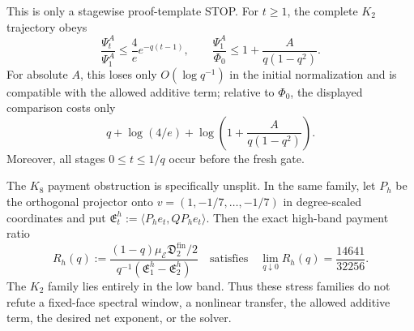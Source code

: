 \begin{proposition}
This is only a stagewise proof-template STOP.  For $t\geq1$, the complete
$K_2$ trajectory obeys
\begin{equation}
 \frac{\Psi_t^A}{\Psi_1^A}
 \leq\frac4e e^{-q(t-1)},
 \qquad
 \frac{\Psi_1^A}{\Phi_0}
 \leq1+\frac{A}{q(1-q^2)}.
 \label{eq:aesp-cd-k2-low-mode-global-bound}
\end{equation}
For absolute $A$, this loses only $O(\log q^{-1})$ in the initial
normalization and is compatible with the allowed additive term; relative to
$\Phi_0$, the displayed comparison costs only
\begin{equation*}
 q+\log(4/e)+\log\left(1+\frac{A}{q(1-q^2)}\right).
\end{equation*}
Moreover, all stages $0\leq t\leq1/q$ occur before the fresh gate.

The $K_8$ payment obstruction is specifically unsplit.  In the same family,
let $P_h$ be the orthogonal projector onto
$v=(1,-1/7,\ldots,-1/7)$ in degree-scaled coordinates and put
$\mathfrak E_t^h:=\langle P_he_t,QP_he_t\rangle$.  Then the exact high-band
payment ratio
\begin{equation}
 R_h(q):=
 \frac{(1-q)\mu_{\mathcal E}\mathfrak D_2^{\mathrm{fin}}/2}
      {q^{-1}(\mathfrak E_1^h-\mathfrak E_2^h)}
 \quad\text{satisfies}\quad
 \lim_{q\downarrow0}R_h(q)=\frac{14641}{32256}.
 \label{eq:aesp-cd-k8-high-band-payment-limit}
\end{equation}
The $K_2$ family lies entirely in the low band.  Thus these stress families
do not refute a fixed-face spectral window, a nonlinear transfer, the allowed
additive term, the desired net exponent, or the solver.
\end{proposition}

